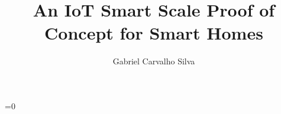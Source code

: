\documentclass[
12pt,        %
openright,   %
twoside,     %
a4paper,     %
brazil,       %
english       %
%
%
]{ppgca}
\title{An IoT Smart Scale Proof of Concept for Smart Homes}
\author{Gabriel Carvalho Silva}
\begin{document}
=0
\newcommand{\sectionbreak}{\clearpage
\fancyhead[LE,RO]{}
\fancyhead[RE,LO]{}
\renewcommand{\headrulewidth}{0pt}
\renewcommand{\footrulewidth}{0pt}}
\fi


\imprimircapa

\imprimirfolhaderosto



%
%     
\end{document}
